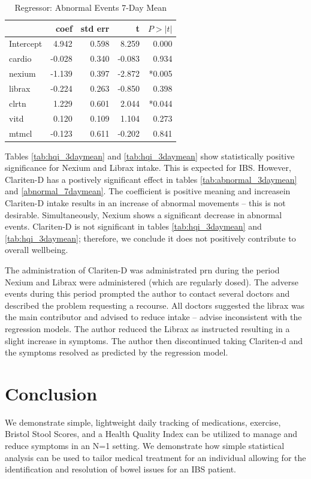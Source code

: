 \documentclass[conference]{IEEEtran}
\begin{document}
\begin{table}
\begin{center}
\caption{Regressor: Abnormal Events 7-Day Mean} \label{tab:abnormal_7daymean}
    \begin{tabular}{ | l | r | r | r | r |}
    \hline
     & coef & std err & t & $P>\left|t\right|$ \\ \hline
Intercept & 4.942 & 0.598 & 8.259 & 0.000 \\
cardio & -0.028 & 0.340 & -0.083 & 0.934 \\
nexium & -1.139 & 0.397 & -2.872 & *0.005 \\
librax & -0.224 & 0.263 & -0.850 & 0.398 \\
clrtn & 1.229 & 0.601 & 2.044 & *0.044 \\
vitd & 0.120 & 0.109 & 1.104 & 0.273 \\
mtmcl & -0.123 & 0.611 & -0.202 & 0.841 \\
    \hline
    \end{tabular}
\end{center}
\end{table}

Tables \ref{tab:hqi_3daymean} and \ref{tab:hqi_3daymean} show statistically positive significance for Nexium and Librax intake.  This is expected for IBS.  However, Clariten-D has a postively significant effect in tables \ref{tab:abnormal_3daymean} and \ref{abnormal_7daymean}.  The coefficient is positive meaning and increasein Clariten-D intake results in an increase of abnormal movements -- this is not desirable. Simultaneously, Nexium shows a significant decrease in abnormal events.  Clariten-D is not significant in tables \ref{tab:hqi_3daymean} and \ref{tab:hqi_3daymean}; therefore, we conclude it does not positively contribute to overall wellbeing.

 The administration of Clariten-D was administrated prn during the period Nexium and Librax were administered (which are regularly dosed).  The adverse events during this period prompted the author to contact several doctors and described the problem requesting a recourse.  All doctors suggested the librax was the main contributor and advised to reduce intake -- advise inconsistent with the regression models.  The author reduced the Librax as instructed  resulting in a slight increase in symptoms. The author then discontinued taking Clariten-d and the symptoms resolved as predicted by the regression model.

\section*{Conclusion}
We demonstrate simple, lightweight daily tracking of medications, exercise, Bristol Stool Scores, and a Health Quality Index can be utilized to manage and reduce symptoms in an N=1 setting.  We demonstrate how simple statistical analysis can be used to tailor medical treatment for an individual allowing for the identification and resolution of bowel issues for an IBS patient.
\end{document}
